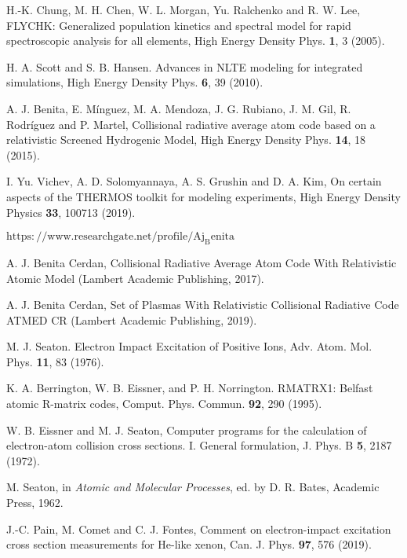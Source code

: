 \documentclass[a4paper,10pt]{article}
\begin{document}
\begin{thebibliography}{99}

H.-K. Chung, M. H. Chen, W. L. Morgan, Yu. Ralchenko and R. W. Lee, FLYCHK: Generalized population kinetics and spectral model for rapid spectroscopic analysis for all elements, High Energy Density Phys. {\bf 1}, 3 (2005).

H. A. Scott and S. B. Hansen. Advances in NLTE modeling for integrated simulations, High Energy Density Phys. {\bf 6}, 39 (2010).

A. J. Benita, E. M\'inguez, M. A. Mendoza, J. G. Rubiano, J. M. Gil, R. Rodr\'iguez and P. Martel, Collisional radiative average atom code based on a relativistic Screened Hydrogenic Model, High Energy Density Phys. {\bf 14}, 18 (2015).

I. Yu. Vichev, A. D. Solomyannaya, A. S. Grushin and D. A. Kim, On certain aspects of the THERMOS toolkit for modeling experiments, High Energy Density Physics {\bf 33}, 100713 (2019). 

 $\mathrm{https://www.researchgate.net/profile/Aj_Benita}$

 A. J. Benita Cerdan, Collisional Radiative Average Atom Code With Relativistic Atomic Model (Lambert Academic Publishing, 2017).

 A. J. Benita Cerdan, Set of Plasmas With Relativistic Collisional Radiative Code ATMED CR (Lambert Academic Publishing, 2019).


M. J. Seaton. Electron Impact Excitation of Positive Ions, Adv. Atom. Mol. Phys. {\bf 11}, 83 (1976).

K. A. Berrington, W. B. Eissner, and P. H. Norrington. RMATRX1: Belfast atomic R-matrix codes, Comput. Phys. Commun. {\bf 92}, 290 (1995).

W. B. Eissner and M. J. Seaton, Computer programs for the calculation of electron-atom collision cross sections. I. General formulation, J. Phys. B {\bf 5}, 2187 (1972).

M. Seaton, in {\it Atomic and Molecular Processes}, ed. by D. R. Bates, Academic Press, 1962.

J.-C. Pain, M. Comet and C. J. Fontes, Comment on electron-impact excitation cross section measurements for He-like xenon, Can. J. Phys. {\bf 97}, 576 (2019).


\end{thebibliography}
\end{document}
